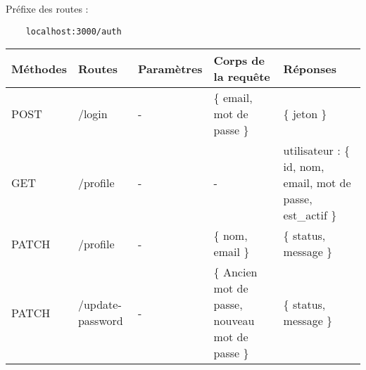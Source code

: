 Préfixe des routes :
\begin{lstlisting}
    localhost:3000/auth
\end{lstlisting}
\begin{center}
    \begin{tabularx}{1\textwidth} {
        | >{\raggedright\arraybackslash}X
        | >{\centering\arraybackslash}X
        | >{\centering\arraybackslash}X
        | >{\centering\arraybackslash}X
        | >{\raggedleft\arraybackslash}X | }
        \hline
            Méthodes & Routes & Paramètres & Corps de la requête & Réponses \\
        \hline
            POST  & /login & - & \{ email, mot de passe \}  & \{ jeton \} \\
        \hline
            GET  & /profile & - & - &  utilisateur : \{ id, nom, email, mot de passe, est\_actif \}  \\
        \hline
            PATCH  & /profile & - & \{ nom, email \} & \{ status, message \} \\
        \hline
            PATCH  & /update-password & - & \{ Ancien mot de passe, nouveau mot de passe \} & \{ status, message \} \\
        \hline
    \end{tabularx}
\end{center}
\pagebreak

